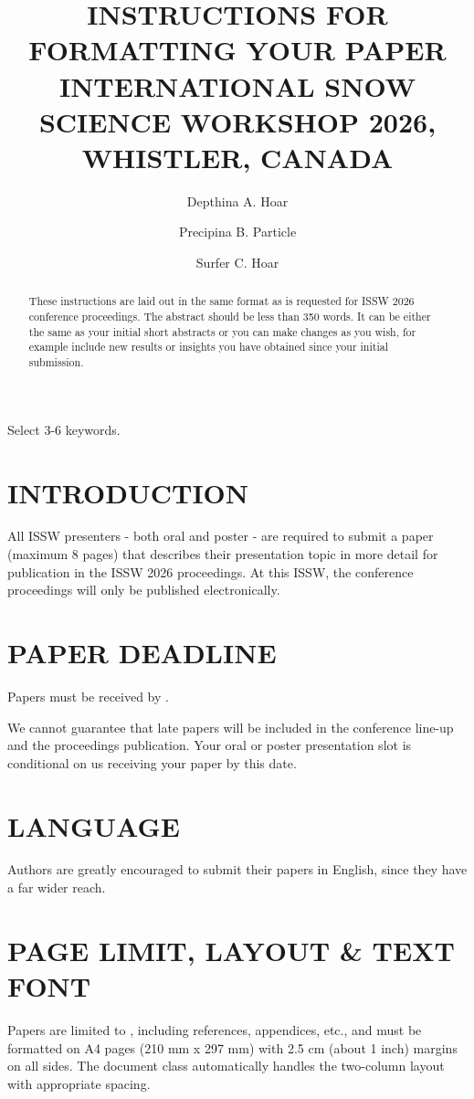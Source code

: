 \documentclass{issw}
\title{INSTRUCTIONS FOR FORMATTING YOUR PAPER\\
INTERNATIONAL SNOW SCIENCE WORKSHOP 2026, WHISTLER, CANADA}
\author[1]{Depthina A. Hoar\corref{complete\_address}}
\author[2]{Precipina B. Particle}
\author[1,3]{Surfer C. Hoar}
\begin{document}
\begin{abstract}
These instructions are laid out in the same format as is requested for ISSW 2026 conference proceedings. The abstract should be less than 350 words. It can be either the same as your initial short abstracts or you can make changes as you wish, for example include new results or insights you have obtained since your initial submission.
\end{abstract}

\begin{keyword}
Select 3-6 keywords.
\end{keyword}

\maketitle


\section{INTRODUCTION}
All ISSW presenters - both oral and poster - are required to submit a paper (maximum 8 pages) that describes their presentation topic in more detail for publication in the ISSW 2026 proceedings. At this ISSW, the conference proceedings will only be published electronically.

\section{PAPER DEADLINE}
Papers must be received by \textbf{}.

We cannot guarantee that late papers will be included in the conference line-up and the proceedings publication. Your oral or poster presentation slot is conditional on us receiving your paper by this date.

\section{LANGUAGE} 
Authors are greatly encouraged to submit their papers in English, since they have a far wider reach.

\section{PAGE LIMIT, LAYOUT \& TEXT FONT}
Papers are limited to \textbf{}, including references, appendices, etc., and must be formatted on A4 pages (210 mm x 297 mm) with 2.5 cm (about 1 inch) margins on all sides. The document class automatically handles the two-column layout with appropriate spacing.
\end{document}
